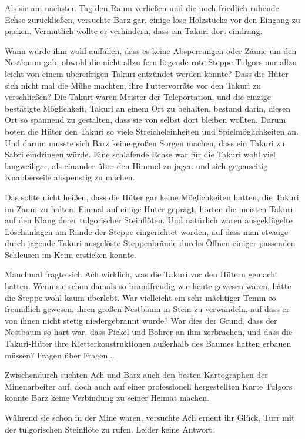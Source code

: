 Als sie am nächsten Tag den Raum verließen und die noch friedlich ruhende Echse zurückließen, versuchte Barz gar, einige lose Holzstücke vor den Eingang zu packen. Vermutlich wollte er verhindern, dass ein Takuri dort eindrang.

Wann würde ihm wohl auffallen, dass es keine Absperrungen oder Zäune um den Nestbaum gab, obwohl die nicht allzu fern liegende rote Steppe Tulgors nur allzu leicht von einem übereifrigen Takuri entzündet werden könnte? Dass die Hüter sich nicht mal die Mühe machten, ihre Futtervorräte vor den Takuri zu verschließen? Die Takuri waren Meister der Teleportation, und die einzige bestätigte Möglichkeit, Takuri an einem Ort zu behalten, bestand darin, diesen Ort so spannend zu gestalten, dass sie von selbst dort bleiben wollten. Darum boten die Hüter den Takuri so viele Streicheleinheiten und Spielmöglichkeiten an. Und darum musste sich Barz keine großen Sorgen machen, dass ein Takuri zu Sabri eindringen würde. Eine schlafende Echse war für die Takuri wohl viel langweiliger, als einander über den Himmel zu jagen und sich gegenseitig Knabberseile abspenstig zu machen.

Das sollte nicht heißen, dass die Hüter gar keine Möglichkeiten hatten, die Takuri im Zaum zu halten. Einmal auf einige Hüter geprägt, hörten die meisten Takuri auf den Klang derer tulgorischer Steinflöten. Und natürlich waren ausgeklügelte Löschanlagen am Rande der Steppe eingerichtet worden, auf dass man etwaige durch jagende Takuri ausgelöste Steppenbrände durchs Öffnen einiger passenden Schleusen im Keim ersticken konnte.

Manchmal fragte sich Aćh wirklich, was die Takuri vor den Hütern gemacht hatten. Wenn sie schon damals so brandfreudig wie heute gewesen waren, hätte die Steppe wohl kaum überlebt. War vielleicht ein sehr mächtiger Temm so freundlich gewesen, ihren großen Nestbaum in Stein zu verwandeln, auf dass er von ihnen nicht stetig niedergebrannt wurde? War dies der Grund, dass der Nestbaum so hart war, dass Pickel und Bohrer an ihm zerbrachen, und dass die Takuri-Hüter ihre Kletterkonstruktionen außerhalb des Baumes hatten erbauen müssen? Fragen über Fragen...

Zwischendurch suchten Aćh und Barz auch den besten Kartographen der Minenarbeiter auf, doch auch auf einer professionell hergestellten Karte Tulgors konnte Barz keine Verbindung zu seiner Heimat machen.

Während sie schon in der Mine waren, versuchte Aćh erneut ihr Glück, Turr mit der tulgorischen Steinflöte zu rufen. Leider keine Antwort.



